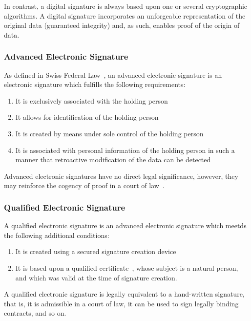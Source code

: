 In contrast, a digital signature is always based upon one or several cryptographic algorithms.
A digital signature incorporates an unforgeable representation of the original data (guaranteed integrity)
and, as such, enables proof of the origin of data.

\subsubsection{Advanced Electronic Signature}
As defined in Swiss Federal Law~\cite[Art. 2]{zertes},
an advanced electronic signature is an electronic signature which fulfills the following requirements:

\begin{enumerate}
    \item It is exclusively associated with the holding person
    \item It allows for identification of the holding person
    \item It is created by means under sole control of the holding person
    \item It is associated with personal information of the holding person in such a manner that retroactive modification of the data can be detected
\end{enumerate}

Advanced electronic signatures have no direct legal significance, however,
they may reinforce the cogency of proof in a court of law~\cite[4.19]{crypto-folien-hassenstein}.

\subsubsection{Qualified Electronic Signature}\label{subsubsec:qualifiedsignature}
A qualified electronic signature is an advanced electronic signature which meetds the following additional conditions:
\begin{enumerate}
    \item It is created using a secured signature creation device~\cite[Art. 6]{zertes}
    \item It is based upon a qualified certificate~\cite[Art. 7 and 8]{zertes}, whose subject is a natural person,
    and which was valid at the time of signature creation.
\end{enumerate}

A qualified electronic signature is legally equivalent to a hand-written signature, that is,
it is admissible in a court of law, it can be used to sign legally binding contracts, and so on.


